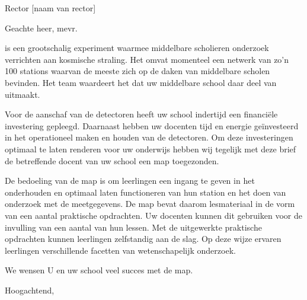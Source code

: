 

\signature{Het \hisparc team}
\address{Science Park 105\\
         1098 XG \\
         Amsterdam}



\begin{letter}{Rector [naam van rector] \\ [adres van school]}

\opening{Geachte heer, mevr.}

\hisparc is een grootschalig experiment waarmee middelbare scholieren
onderzoek verrichten aan kosmische straling. Het omvat momenteel een
netwerk van zo'n 100 stations waarvan de meeste zich op de daken van
middelbare scholen bevinden. Het \hisparc team waardeert het dat uw
middelbare school daar deel van uitmaakt.

Voor de aanschaf van de detectoren heeft uw school indertijd een
financiële investering gepleegd. Daarnaast hebben uw docenten tijd en
energie geïnvesteerd in het operationeel maken en houden van de
detectoren. Om deze investeringen optimaal te laten renderen voor uw
onderwijs hebben wij tegelijk met deze brief de betreffende docent van
uw school een \hisparc map toegezonden.

De bedoeling van de \hisparc map is om leerlingen een ingang te geven in
het onderhouden en optimaal laten functioneren van hun \hisparc station
en het doen van onderzoek met de meetgegevens. De \hisparc map bevat
daarom lesmateriaal in de vorm van een aantal praktische opdrachten. Uw
docenten kunnen dit gebruiken voor de invulling van een aantal van hun
lessen. Met de uitgewerkte praktische opdrachten kunnen leerlingen
zelfstandig aan de slag. Op deze wijze ervaren leerlingen verschillende
facetten van wetenschapelijk onderzoek.

We wensen U en uw school veel succes met de \hisparc map.

\closing{Hoogachtend,}


\end{letter}

